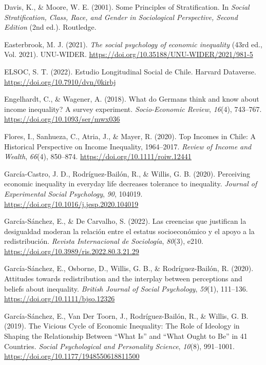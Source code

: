 \documentclass[
  12pt,
]{article}
\newlength{\cslhangindent}
\newenvironment{CSLReferences}[2] %
 {\begin{list}{}{%
  \setlength{\itemindent}{0pt}
  \setlength{\leftmargin}{0pt}
  \setlength{\parsep}{0pt}
  \ifodd #1
   \setlength{\leftmargin}{\cslhangindent}
   \setlength{\itemindent}{-1\cslhangindent}
  \fi
  \setlength{\itemsep}{#2\baselineskip}}}
 {\end{list}}
\begin{document}
\begin{CSLReferences}{1}{0}
Davis, K., \& Moore, W. E. (2001). Some {Principles} of
{Stratification}. In \emph{Social {Stratification}, {Class}, {Race}, and
{Gender} in {Sociological Perspective}, {Second Edition}} (2nd ed.).
Routledge.

Easterbrook, M. J. (2021). \emph{The social psychology of economic
inequality} (43rd ed., Vol. 2021). UNU-WIDER.
\url{https://doi.org/10.35188/UNU-WIDER/2021/981-5}

ELSOC, S. T. (2022). Estudio {Longitudinal Social} de {Chile}. Harvard
Dataverse. \url{https://doi.org/10.7910/dvn/0kirbj}

Engelhardt, C., \& Wagener, A. (2018). What do {Germans} think and know
about income inequality? {A} survey experiment. \emph{Socio-Economic
Review}, \emph{16}(4), 743--767.
\url{https://doi.org/10.1093/ser/mwx036}

Flores, I., Sanhueza, C., Atria, J., \& Mayer, R. (2020). Top {Incomes}
in {Chile}: {A Historical Perspective} on {Income Inequality},
1964--2017. \emph{Review of Income and Wealth}, \emph{66}(4), 850--874.
\url{https://doi.org/10.1111/roiw.12441}

García-Castro, J. D., Rodríguez-Bailón, R., \& Willis, G. B. (2020).
Perceiving economic inequality in everyday life decreases tolerance to
inequality. \emph{Journal of Experimental Social Psychology}, \emph{90},
104019. \url{https://doi.org/10.1016/j.jesp.2020.104019}

García-Sánchez, E., \& De Carvalho, S. (2022). Las creencias que
justifican la desigualdad moderan la relaci{ó}n entre el estatus
socioecon{ó}mico y el apoyo a la redistribuci{ó}n. \emph{Revista
Internacional de Sociolog{í}a}, \emph{80}(3), e210.
\url{https://doi.org/10.3989/ris.2022.80.3.21.29}

García-Sánchez, E., Osborne, D., Willis, G. B., \& Rodríguez-Bailón, R.
(2020). Attitudes towards redistribution and the interplay between
perceptions and beliefs about inequality. \emph{British Journal of
Social Psychology}, \emph{59}(1), 111--136.
\url{https://doi.org/10.1111/bjso.12326}

García-Sánchez, E., Van Der Toorn, J., Rodríguez-Bailón, R., \& Willis,
G. B. (2019). The {Vicious Cycle} of {Economic Inequality}: {The Role}
of {Ideology} in {Shaping} the {Relationship Between} {``{What Is}''}
and {``{What Ought} to {Be}''} in 41 {Countries}. \emph{Social
Psychological and Personality Science}, \emph{10}(8), 991--1001.
\url{https://doi.org/10.1177/1948550618811500}


\end{CSLReferences}
\end{document}
